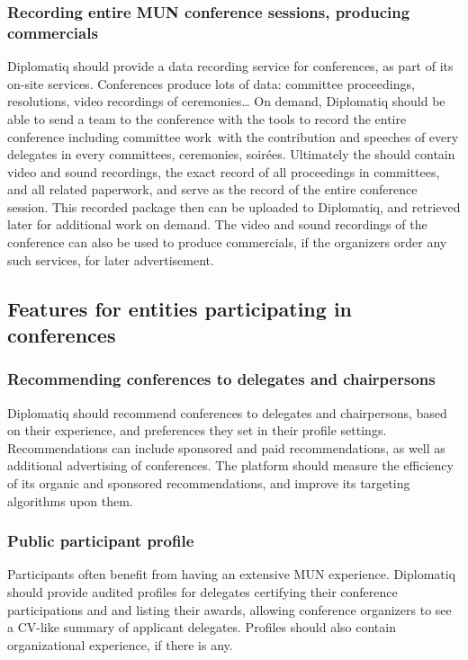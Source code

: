 \subsubsection{Recording entire MUN conference sessions, producing commercials}

Diplomatiq should provide a data recording service for conferences, as part of its on-site services. Conferences produce lots of data: committee proceedings, resolutions, video recordings of ceremonies… On demand, Diplomatiq should be able to send a team to the conference with the tools to record the entire conference including committee work with the contribution and speeches of every delegates in every committees, ceremonies, soirées. Ultimately the  should contain video and sound recordings, the exact record of all proceedings in committees, and all related paperwork, and serve as the record of the entire conference session. This recorded package then can be uploaded to Diplomatiq, and retrieved later for additional work on demand. The video and sound recordings of the conference can also be used to produce commercials, if the organizers order any such services, for later advertisement.

\subsection{Features for entities participating in conferences}

\subsubsection{Recommending conferences to delegates and chairpersons}

Diplomatiq should recommend conferences to delegates and chairpersons, based on their experience, and preferences they set in their profile settings. Recommendations can include sponsored and paid recommendations, as well as additional advertising of conferences. The platform should measure the efficiency of its organic and sponsored recommendations, and improve its targeting algorithms upon them.

\subsubsection{Public participant profile}

Participants often benefit from having an extensive MUN experience. Diplomatiq should provide audited profiles for delegates certifying their conference participations and and listing their awards, allowing conference organizers to see a CV-like summary of applicant delegates. Profiles should also contain organizational experience, if there is any.

